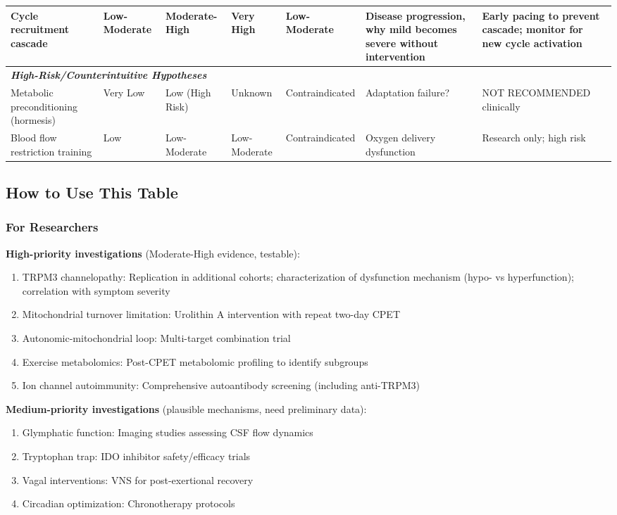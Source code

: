\begin{landscape}
\begin{longtable}{p{3.5cm}p{2cm}p{2cm}p{1.8cm}p{1.8cm}p{4.5cm}p{5cm}}
\midrule
Cycle recruitment cascade & Low-Moderate & Moderate-High & Very High & Low-Moderate & Disease progression, why mild becomes severe without intervention & Early pacing to prevent cascade; monitor for new cycle activation \\
\midrule
\multicolumn{7}{l}{\textit{\textbf{High-Risk/Counterintuitive Hypotheses}}} \\
\midrule
Metabolic preconditioning (hormesis) & Very Low & Low (High Risk) & Unknown & Contraindicated & Adaptation failure? & NOT RECOMMENDED clinically \\
\midrule
Blood flow restriction training & Low & Low-Moderate & Low-Moderate & Contraindicated & Oxygen delivery dysfunction & Research only; high risk \\
\end{longtable}
\normalsize
\end{landscape}

\subsection{How to Use This Table}

\subsubsection{For Researchers}

\textbf{High-priority investigations} (Moderate-High evidence, testable):
\begin{enumerate}
    \item TRPM3 channelopathy: Replication in additional cohorts; characterization of dysfunction mechanism (hypo- vs hyperfunction); correlation with symptom severity
    \item Mitochondrial turnover limitation: Urolithin A intervention with repeat two-day CPET
    \item Autonomic-mitochondrial loop: Multi-target combination trial
    \item Exercise metabolomics: Post-CPET metabolomic profiling to identify subgroups
    \item Ion channel autoimmunity: Comprehensive autoantibody screening (including anti-TRPM3)
\end{enumerate}

\textbf{Medium-priority investigations} (plausible mechanisms, need preliminary data):
\begin{enumerate}
    \item Glymphatic function: Imaging studies assessing CSF flow dynamics
    \item Tryptophan trap: IDO inhibitor safety/efficacy trials
    \item Vagal interventions: VNS for post-exertional recovery
    \item Circadian optimization: Chronotherapy protocols
\end{enumerate}


